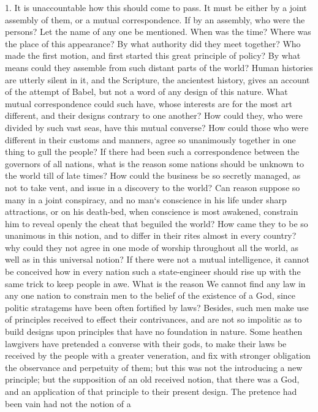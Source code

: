 \documentclass[a5paper]{book}
\begin{document}
1. It is unaccountable how this should come to pass. It must be
either by a joint assembly of them, or a mutual correspondence. If
by an assembly, who were the persons? Let the name of any one
be mentioned. When was the time? Where was the place of this
appearance? By what authority did they meet together? Who
made the first motion, and first started this great principle of policy?
By what means could they assemble from such distant parts of the
world? Human histories are utterly silent in it, and the Scripture,
the ancientest history, gives an account of the attempt of Babel, but
not a word of any design of this nature. What mutual correspondence 
could such have, whose interests are for the most art different, 
and their designs contrary to one another? How could they, who
were divided by such vast seas, have this mutual converse? How
could those who were different in their customs and manners, agree
so unanimously together in one thing to gull the people? If there
had been such a correspondence between the governors of all nations,
what is the reason some nations should be unknown to the world
till of late times? How could the business be so secretly managed,
as not to take vent, and issue in a discovery to the world? Can
reason suppose so many in a joint conspiracy, and no man`s 
conscience in his life under sharp attractions, or on his death-bed, when
conscience is most awakened, constrain him to reveal openly the
cheat that beguiled the world? How came they to be so unanimous
in this notion, and to differ in their rites almost in every country? %
why could they not agree in one mode of worship throughout all
the world, as well as in this universal notion? If there were not a
mutual intelligence, it cannot be conceived how in every nation such
a state-engineer should rise up with the same trick to keep people in
awe. What is the reason We cannot find any law in any one nation
to constrain men to the belief of the existence of a God, since politic
stratagems have been often fortified by laws? Besides, such men
make use of principles received to effect their contrivances, and are
not so impolitic as to build designs upon principles that have no
foundation in nature. Some heathen lawgivers have pretended a
converse with their gods, to make their laws be received by the
people with a greater veneration, and fix with stronger obligation
the observance and perpetuity of them; but this was not the 
introducing a new principle; but the supposition of an old received notion,
that there was a God, and an application of that principle to their
present design. The pretence had been vain had not the notion of a
\end{document}
